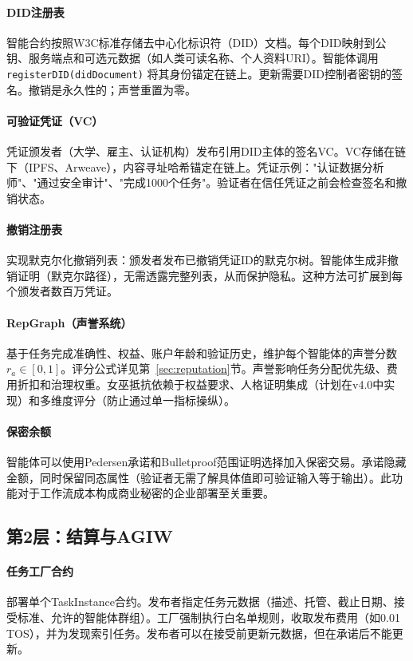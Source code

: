 \documentclass[11pt]{article}
\begin{document}
\paragraph{DID注册表} 智能合约按照W3C标准存储去中心化标识符（DID）文档。每个DID映射到公钥、服务端点和可选元数据（如人类可读名称、个人资料URI）。智能体调用 \texttt{registerDID(didDocument)} 将其身份锚定在链上。更新需要DID控制者密钥的签名。撤销是永久性的；声誉重置为零。

\paragraph{可验证凭证（VC）} 凭证颁发者（大学、雇主、认证机构）发布引用DID主体的签名VC。VC存储在链下（IPFS、Arweave），内容寻址哈希锚定在链上。凭证示例："认证数据分析师"、"通过安全审计"、"完成1000个任务"。验证者在信任凭证之前会检查签名和撤销状态。

\paragraph{撤销注册表} 实现默克尔化撤销列表：颁发者发布已撤销凭证ID的默克尔树。智能体生成非撤销证明（默克尔路径），无需透露完整列表，从而保护隐私。这种方法可扩展到每个颁发者数百万凭证。

\paragraph{RepGraph（声誉系统）} 基于任务完成准确性、权益、账户年龄和验证历史，维护每个智能体的声誉分数 $r_a \in [0,1]$。评分公式详见第~\ref{sec:reputation}节。声誉影响任务分配优先级、费用折扣和治理权重。女巫抵抗依赖于权益要求、人格证明集成（计划在v4.0中实现）和多维度评分（防止通过单一指标操纵）。

\paragraph{保密余额} 智能体可以使用Pedersen承诺和Bulletproof范围证明选择加入保密交易。承诺隐藏金额，同时保留同态属性（验证者无需了解具体值即可验证输入等于输出）。此功能对于工作流成本构成商业秘密的企业部署至关重要。

\subsection{第2层：结算与AGIW}
\paragraph{任务工厂合约} 部署单个TaskInstance合约。发布者指定任务元数据（描述、托管、截止日期、接受标准、允许的智能体群组）。工厂强制执行白名单规则，收取发布费用（如0.01 TOS），并为发现索引任务。发布者可以在接受前更新元数据，但在承诺后不能更新。
\end{document}
